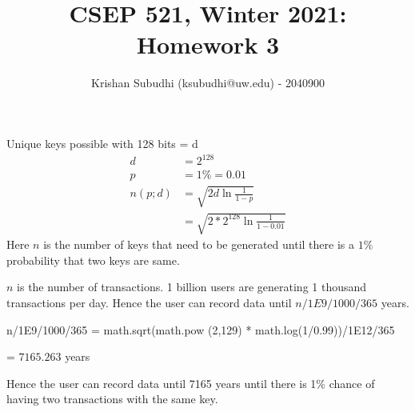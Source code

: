 \documentclass{homeworg}
\title{CSEP 521, Winter 2021: Homework 3}
\author{Krishan Subudhi (ksubudhi@uw.edu) - 2040900}
\begin{document}
\maketitle

\exercise
Unique keys possible with 128 bits = d
\begin{align*}
d &=  2^{128}\\
p &= 1\% =0.01\\
n(p;d) &= \sqrt{2d \ln{\frac{1}{1-p}}}\\
& = \sqrt{2 \ast 2^{128} \ln{\frac{1}{1-0.01}}}
\end{align*}
Here $n$ is the number of keys that need to be generated until there is a $1\%$ probability that two keys are same. 

$n$ is the number of transactions. 1 billion users are generating 1 thousand transactions per day. Hence the user can record data until $n/1E9/1000/365$ years.

\begin{python}
n/1E9/1000/365 = math.sqrt(math.pow (2,129) * math.log(1/0.99))/1E12/365
\end{python}
 = $7165.263$ years
 
Hence the user can record data until 7165 years until there is 1\% chance of having two transactions with the same key.
\newpage

\exercise
\end{document}
